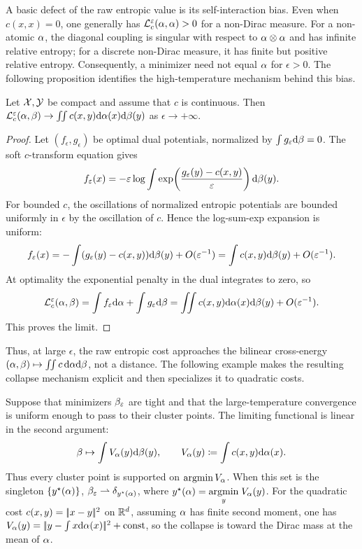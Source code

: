 A basic defect of the raw entropic value is its self-interaction bias. Even when $c(x,x)=0$, one generally has $\mathcal{L}_c^\varepsilon(\alpha,\alpha)>0$ for a non-Dirac measure. For a non-atomic $\alpha$, the diagonal coupling is singular with respect to $\alpha\otimes\alpha$ and has infinite relative entropy; for a discrete non-Dirac measure, it has finite but positive relative entropy. Consequently, a minimizer
\eq{
	\be_\epsilon\in\uargmin{\be}\MK_\c^\epsilon(\al,\be)
}
need not equal $\alpha$ for $\epsilon>0$. The following proposition identifies the high-temperature mechanism behind this bias.

\begin{prop}
		Let $\mathcal{X},\mathcal{Y}$ be compact and assume that $c$ is continuous. Then $\mathcal{L}_c^\varepsilon(\alpha,\beta) \rightarrow \iint c(x,y)\mathrm{d}\alpha(x)\mathrm{d}\beta(y)$ as $\epsilon \rightarrow +\infty$.
\end{prop}
\begin{proof}
	Let $(f_\epsilon,g_\epsilon)$ be optimal dual potentials, normalized by $\int g_\varepsilon\mathrm{d}\beta=0$. The soft $c$-transform equation gives
	\[
		f_\varepsilon(x)
		=
		-\varepsilon\log\int
		\exp\!\left(\frac{g_\varepsilon(y)-c(x,y)}{\varepsilon}\right)\mathrm{d}\beta(y).
	\]
	For bounded $c$, the oscillations of normalized entropic potentials are bounded uniformly in $\epsilon$ by the oscillation of $c$. Hence the log-sum-exp expansion is uniform:
	\[
		f_\varepsilon(x)
		=
		-\int (g_\varepsilon(y)-c(x,y))\mathrm{d}\beta(y)+O(\varepsilon^{-1})
		=
		\int c(x,y)\mathrm{d}\beta(y)+O(\varepsilon^{-1}).
	\]
	At optimality the exponential penalty in the dual integrates to zero, so
	\[
		\mathcal{L}_c^\varepsilon(\alpha,\beta)
		=
		\int f_\varepsilon\mathrm{d}\alpha+\int g_\varepsilon\mathrm{d}\beta
		=
		\iint c(x,y)\mathrm{d}\alpha(x)\mathrm{d}\beta(y)+O(\varepsilon^{-1}).
	\]
	This proves the limit.
\end{proof}

Thus, at large $\epsilon$, the raw entropic cost approaches the bilinear cross-energy $(\alpha,\beta)\mapsto\iint c\,\mathrm{d}\alpha\mathrm{d}\beta$, not a distance. The following example makes the resulting collapse mechanism explicit and then specializes it to quadratic costs.

\begin{example}
	Suppose that minimizers $\beta_\varepsilon$ are tight and that the large-temperature convergence is uniform enough to pass to their cluster points. The limiting functional is linear in the second argument:
	\[
		\beta\mapsto \int V_\alpha(y)\mathrm{d}\beta(y),
		\qquad
		V_\alpha(y)\coloneqq\int c(x,y)\mathrm{d}\alpha(x).
	\]
	Thus every cluster point is supported on $\operatorname{argmin} V_\alpha$. When this set is the singleton $\{y^\star(\alpha)\}$,
	$\beta_\varepsilon \rightharpoonup \delta_{y^\star(\alpha)}$, where $y^\star(\alpha)=\underset{y}{\operatorname{argmin}}\; V_\alpha(y)$.
	For the quadratic cost $c(x,y)=|\!| x-y |\!|^2$ on $\mathbb{R}^d$, assuming $\alpha$ has finite second moment, one has $V_\alpha(y)=|\!| y-\int x\mathrm{d}\alpha(x) |\!|^2+\mathrm{const}$, so the collapse is toward the Dirac mass at the mean of $\alpha$.
\end{example}

